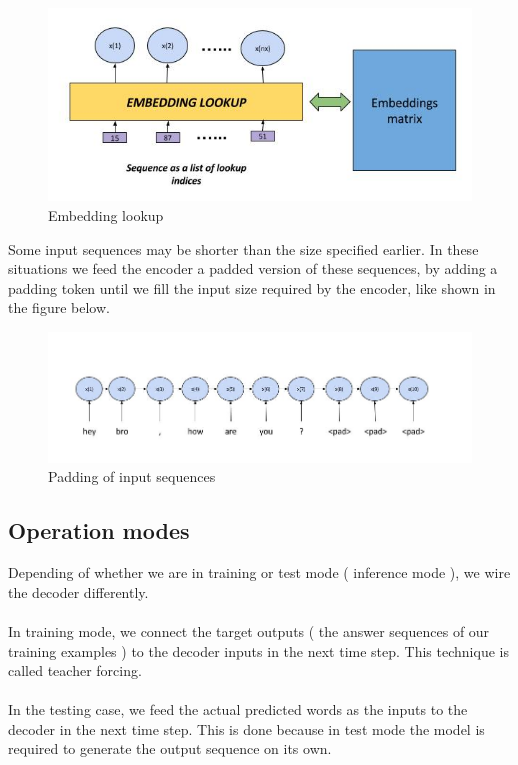 \documentclass{llncs}
\begin{document}
\begin{figure}[H]
    \centering
    \includegraphics[scale=0.4]{../_img/img_embeddingLookup.jpg}
    \caption{Embedding lookup}
    \label{fig:img_embeddingLookup}
\end{figure}

Some input sequences may be shorter than the size specified earlier. In these situations we feed the encoder a padded version of these sequences, by adding a padding token until we fill the input size required by the encoder, like shown in the figure below.

\begin{figure}[H]
    \centering
    \includegraphics[scale=0.5]{../_img/img_encoderPadding.jpg}
    \caption{Padding of input sequences}
    \label{fig:img_encoderPadding}
\end{figure}

\subsection{Operation modes}

Depending of whether we are in training or test mode ( inference mode ), we wire the decoder differently.
\\
\\
In training mode, we connect the target outputs ( the answer sequences of our training examples ) to the decoder inputs in the next time step. This technique is called teacher forcing.
\\
\\
In the testing case, we feed the actual predicted words as the inputs to the decoder in the next time step. This is done because in test mode the model is required to generate the output sequence on its own.
\end{document}
